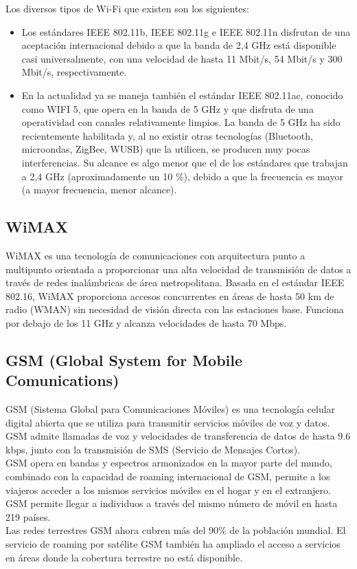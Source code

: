 	Los diversos tipos de Wi-Fi que existen  son los siguientes:
	\begin{itemize}
		\item Los estándares IEEE 802.11b, IEEE 802.11g e IEEE 802.11n disfrutan de una aceptación internacional debido a que la banda de 2,4 GHz está disponible casi universalmente, con una velocidad de hasta 11 Mbit/s, 54 Mbit/s y 300 Mbit/s, respectivamente.
		\item En la actualidad ya se maneja también el estándar IEEE 802.11ac, conocido como WIFI 5, que opera en la banda de 5 GHz y que disfruta de una operatividad con canales relativamente limpios. La banda de 5 GHz ha sido recientemente habilitada y, al no existir otras tecnologías (Bluetooth, microondas, ZigBee, WUSB) que la utilicen, se producen muy pocas interferencias. Su alcance es algo menor que el de los estándares que trabajan a 2,4 GHz (aproximadamente un 10 \%), debido a que la frecuencia es mayor (a mayor frecuencia, menor alcance).
	\end{itemize}

	
	\subsection{WiMAX}
	WiMAX es una tecnología de comunicaciones con arquitectura punto a multipunto orientada a proporcionar una alta velocidad de transmisión de datos a través de redes inalámbricas de área metropolitana.  Basada en el estándar IEEE 802.16, WiMAX proporciona accesos concurrentes en áreas de hasta 50 km de radio (WMAN) sin necesidad de visión directa con las estaciones base. Funciona por debajo de los 11 GHz y alcanza velocidades de hasta 70 Mbps.
	
	
	\subsection{GSM (Global System for Mobile Comunications)}
	GSM (Sistema Global para Comunicaciones Móviles) es una tecnología celular digital abierta que se utiliza para transmitir servicios móviles de voz y datos. GSM admite llamadas de voz y velocidades de transferencia de datos de hasta 9.6 kbps, junto con la transmisión de SMS (Servicio de Mensajes Cortos). \\

	GSM opera en bandas y espectros armonizados en la mayor parte del mundo, combinado con la capacidad de roaming internacional de GSM, permite a los viajeros acceder a los mismos servicios móviles en el hogar y en el extranjero. GSM permite llegar a individuos a través del mismo número de móvil en hasta 219 países. \\

	Las redes terrestres GSM ahora cubren más del 90\% de la población mundial. El servicio de roaming por satélite GSM también ha ampliado el acceso a servicios en áreas donde la cobertura terrestre no está disponible.

	